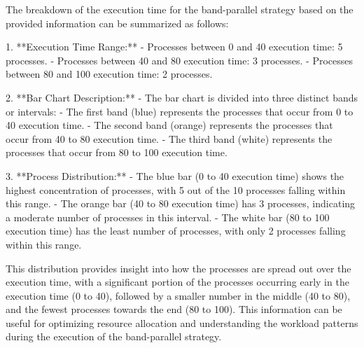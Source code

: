 The breakdown of the execution time for the band-parallel strategy based on the provided information can be summarized as follows:

1. **Execution Time Range:**
   - Processes between 0 and 40 execution time: 5 processes.
   - Processes between 40 and 80 execution time: 3 processes.
   - Processes between 80 and 100 execution time: 2 processes.

2. **Bar Chart Description:**
   - The bar chart is divided into three distinct bands or intervals:
     - The first band (blue) represents the processes that occur from 0 to 40 execution time.
     - The second band (orange) represents the processes that occur from 40 to 80 execution time.
     - The third band (white) represents the processes that occur from 80 to 100 execution time.

3. **Process Distribution:**
   - The blue bar (0 to 40 execution time) shows the highest concentration of processes, with 5 out of the 10 processes falling within this range.
   - The orange bar (40 to 80 execution time) has 3 processes, indicating a moderate number of processes in this interval.
   - The white bar (80 to 100 execution time) has the least number of processes, with only 2 processes falling within this range.

This distribution provides insight into how the processes are spread out over the execution time, with a significant portion of the processes occurring early in the execution time (0 to 40), followed by a smaller number in the middle (40 to 80), and the fewest processes towards the end (80 to 100). This information can be useful for optimizing resource allocation and understanding the workload patterns during the execution of the band-parallel strategy.